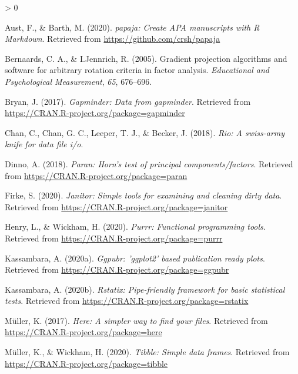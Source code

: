 \documentclass[
  english,
  man, fleqn, noextraspace]{apa6}
\newlength{\cslhangindent}
\newenvironment{CSLReferences}[2] %
 {%
  \setlength{\parindent}{0pt}
  \ifodd #1 \everypar{\setlength{\hangindent}{\cslhangindent}}\ignorespaces\fi
  \ifnum #2 > 0
  \setlength{\parskip}{#2\baselineskip}
  \fi
 }%
 {}
\begin{document}
\begingroup
\setlength{\parindent}{-0.5in}
\setlength{\leftskip}{0.5in}

\hypertarget{refs}{}
\begin{CSLReferences}{1}{0}
\leavevmode\hypertarget{ref-R-papaja}{}%
Aust, F., \& Barth, M. (2020). \emph{{papaja}: {Create} {APA} manuscripts with {R Markdown}}. Retrieved from \url{https://github.com/crsh/papaja}

\leavevmode\hypertarget{ref-R-GPArotation}{}%
Bernaards, C. A., \& I.Jennrich, R. (2005). Gradient projection algorithms and software for arbitrary rotation criteria in factor analysis. \emph{Educational and Psychological Measurement}, \emph{65}, 676--696.

\leavevmode\hypertarget{ref-R-gapminder}{}%
Bryan, J. (2017). \emph{Gapminder: Data from gapminder}. Retrieved from \url{https://CRAN.R-project.org/package=gapminder}

\leavevmode\hypertarget{ref-R-rio}{}%
Chan, C., Chan, G. C., Leeper, T. J., \& Becker, J. (2018). \emph{Rio: A swiss-army knife for data file i/o}.

\leavevmode\hypertarget{ref-R-paran}{}%
Dinno, A. (2018). \emph{Paran: Horn's test of principal components/factors}. Retrieved from \url{https://CRAN.R-project.org/package=paran}

\leavevmode\hypertarget{ref-R-janitor}{}%
Firke, S. (2020). \emph{Janitor: Simple tools for examining and cleaning dirty data}. Retrieved from \url{https://CRAN.R-project.org/package=janitor}

\leavevmode\hypertarget{ref-R-purrr}{}%
Henry, L., \& Wickham, H. (2020). \emph{Purrr: Functional programming tools}. Retrieved from \url{https://CRAN.R-project.org/package=purrr}

\leavevmode\hypertarget{ref-R-ggpubr}{}%
Kassambara, A. (2020a). \emph{Ggpubr: 'ggplot2' based publication ready plots}. Retrieved from \url{https://CRAN.R-project.org/package=ggpubr}

\leavevmode\hypertarget{ref-R-rstatix}{}%
Kassambara, A. (2020b). \emph{Rstatix: Pipe-friendly framework for basic statistical tests}. Retrieved from \url{https://CRAN.R-project.org/package=rstatix}

\leavevmode\hypertarget{ref-R-here}{}%
Müller, K. (2017). \emph{Here: A simpler way to find your files}. Retrieved from \url{https://CRAN.R-project.org/package=here}

\leavevmode\hypertarget{ref-R-tibble}{}%
Müller, K., \& Wickham, H. (2020). \emph{Tibble: Simple data frames}. Retrieved from \url{https://CRAN.R-project.org/package=tibble}


\end{CSLReferences}
\end{document}

